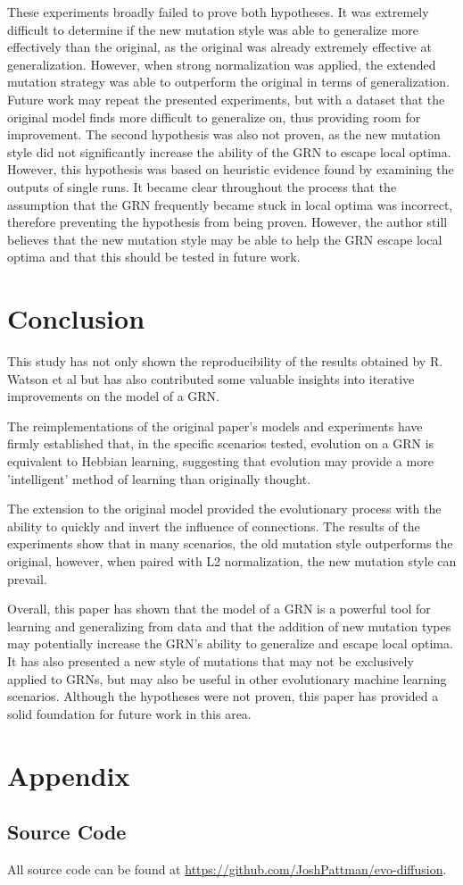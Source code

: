 \documentclass[twocolumn,a4paper,11pt]{article}
\begin{document}
    These experiments broadly failed to prove both hypotheses. It was extremely difficult to determine if the new mutation style was able to generalize more effectively than the original, as the original was already extremely effective at generalization. However, when strong normalization was applied, the extended mutation strategy was able to outperform the original in terms of generalization. Future work may repeat the presented experiments, but with a dataset that the original model finds more difficult to generalize on, thus providing room for improvement. The second hypothesis was also not proven, as the new mutation style did not significantly increase the ability of the GRN to escape local optima. However, this hypothesis was based on heuristic evidence found by examining the outputs of single runs. It became clear throughout the process that the assumption that the GRN frequently became stuck in local optima was incorrect, therefore preventing the hypothesis from being proven. However, the author still believes that the new mutation style may be able to help the GRN escape local optima and that this should be tested in future work.
    
    \section{Conclusion}
    This study has not only shown the reproducibility of the results obtained by R. Watson et al \cite{original-paper} but has also contributed some valuable insights into iterative improvements on the model of a GRN.

    The reimplementations of the original paper's models and experiments have firmly established that, in the specific scenarios tested, evolution on a GRN is equivalent to Hebbian learning, suggesting that evolution may provide a more 'intelligent' method of learning than originally thought.

    The extension to the original model provided the evolutionary process with the ability to quickly and invert the influence of connections. The results of the experiments show that in many scenarios, the old mutation style outperforms the original, however, when paired with L2 normalization, the new mutation style can prevail.

    Overall, this paper has shown that the model of a GRN is a powerful tool for learning and generalizing from data and that the addition of new mutation types may potentially increase the GRN's ability to generalize and escape local optima. It has also presented a new style of mutations that may not be exclusively applied to GRNs, but may also be useful in other evolutionary machine learning scenarios. Although the hypotheses were not proven, this paper has provided a solid foundation for future work in this area.

    

    \section*{Appendix}
    \subsection*{Source Code}
    All source code can be found at \url{https://github.com/JoshPattman/evo-diffusion}.
\end{document}
